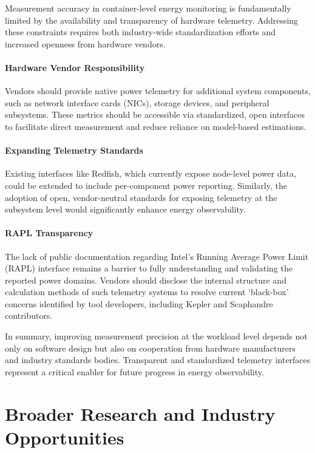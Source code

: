Measurement accuracy in container-level energy monitoring is fundamentally limited by the availability and transparency of hardware telemetry. Addressing these constraints requires both industry-wide standardization efforts and increased openness from hardware vendors.

\paragraph{Hardware Vendor Responsibility}
Vendors should provide native power telemetry for additional system components, such as network interface cards (NICs), storage devices, and peripheral subsystems. These metrics should be accessible via standardized, open interfaces to facilitate direct measurement and reduce reliance on model-based estimations.

\paragraph{Expanding Telemetry Standards}
Existing interfaces like Redfish, which currently expose node-level power data, could be extended to include per-component power reporting. Similarly, the adoption of open, vendor-neutral standards for exposing telemetry at the subsystem level would significantly enhance energy observability.

\paragraph{RAPL Transparency}
The lack of public documentation regarding Intel’s Running Average Power Limit (RAPL) interface remains a barrier to fully understanding and validating the reported power domains. Vendors should disclose the internal structure and calculation methods of such telemetry systems to resolve current ‘black-box’ concerns identified by tool developers, including Kepler and Scaphandre contributors.

In summary, improving measurement precision at the workload level depends not only on software design but also on cooperation from hardware manufacturers and industry standards bodies. Transparent and standardized telemetry interfaces represent a critical enabler for future progress in energy observability.

\section{Broader Research and Industry Opportunities}
\label{sec:future-research-industry}

